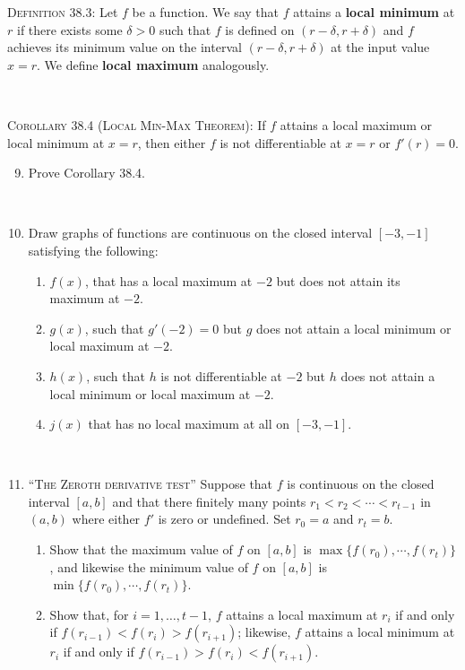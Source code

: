 \documentclass[12pt]{amsart}
\begin{document}
\newpage


\begin{framed} 
 \noindent \noindent \textsc{Definition 38.3:} Let $f$ be a function. We say that $f$ attains a \textbf{local minimum} at $r$ if there exists some $\delta>0$ such that $f$ is defined on $(r-\delta,r+\delta)$ and $f$ achieves its minimum value on the interval $(r-\delta,r+\delta)$ at the input value $x=r$. We define \textbf{local maximum} analogously. 
 
 \
 
   \noindent \textsc{Corollary 38.4 (Local Min-Max Theorem):} If $f$ attains a local maximum or local minimum at $x=r$, then either $f$ is not differentiable at $x=r$ or $f'(r)=0$. 
 \end{framed}



\begin{enumerate}
\setcounter{enumi}{8}
\item Prove Corollary 38.4.

\

\item Draw graphs of functions are continuous on the closed interval $[-3,-1]$ satisfying the following:
\begin{enumerate}
\item  $f(x)$, that has a local maximum at $-2$ but does not attain its maximum at $-2$.
\item  $g(x)$, such that $g'(-2)=0$ but $g$ does not attain a local minimum or local maximum at $-2$.
\item $h(x)$, such that $h$ is not differentiable at $-2$ but $h$ does not attain a local minimum or local maximum at $-2$.
\item $j(x)$ that has no local maximum at all on $[-3,-1]$.
\end{enumerate}

\

\item \textsc{``The Zeroth derivative test''} Suppose that $f$ is continuous on the closed interval $[a,b]$ and that there finitely many points $r_1 < r_2 < \cdots <r_{t-1}$ in $(a,b)$ where either $f'$ is zero or undefined. Set $r_0=a$ and $r_t=b$.
\begin{enumerate}
\item Show that the maximum value of $f$ on $[a,b]$ is $\max\{ f(r_0) , \cdots, f(r_t)\}$, and likewise the minimum value of $f$ on $[a,b]$ is $\min\{ f(r_0) , \cdots, f(r_t)\}$.
\item Show that, for $i=1,\dots,t-1$, $f$ attains a local maximum at $r_i$ if and only if $f(r_{i-1}) < f(r_i) > f(r_{i+1})$; likewise, $f$ attains a local minimum at $r_i$ if and only if $f(r_{i-1}) > f(r_i) < f(r_{i+1})$.
\end{enumerate}


\end{enumerate}
\end{document}
